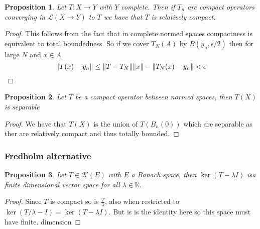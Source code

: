 \documentclass[12pt]{article}
\newtheorem{proposition}{Proposition}
\begin{document}
\begin{proposition}
    Let $T:X\to Y$ with $Y$ complete. Then if $T_n$ are compact operators converging in $\mathcal{L}(X\to Y)$ to $T$ we have that $T$ is relatively compact.
\end{proposition}
\begin{proof}
    This follows from the fact that in complete normed spaces compactness is equivalent to total boundedness. So if we cover $T_N(A)$ by $B(y_n,\epsilon/2)$ then for large $N$ and $x\in A$
    \begin{equation*}
        \norm{T(x)-y_n}\leq \norm{T-T_N}\norm{x}-\norm{T_N(x)-y_n}<\epsilon
    \end{equation*}
\end{proof}
\begin{proposition}
    Let $T$ be a compact operator between normed spaces, then $T(X)$ is separable
\end{proposition}
\begin{proof}
    We have that $T(X)$ is the union of $T(B_n(0))$ which are separable as ther are relatively compact and thus totally bounded.
\end{proof}
\subsubsection{Fredholm alternative}
\begin{proposition}
    Let $T\in\mathcal{K}(E)$ with $E$ a Banach space, then $\ker(T-\lambda I)$ isa finite dimensional vector space for all $\lambda\in\mathbb{K}$.
\end{proposition}
\begin{proof}
    Since $T$ is compact so is $\frac{T}{\lambda}$, also when restricted to $\ker(T/\lambda-I)=\ker(T-\lambda I)$. But is is the identity here so this space must have finite. dimension
\end{proof}
\end{document}
